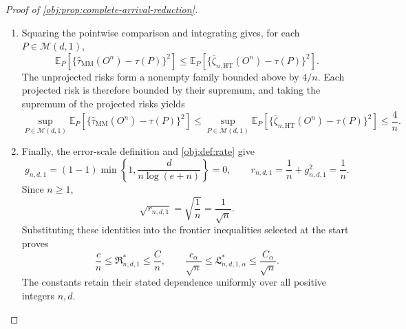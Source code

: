 \documentclass[11pt]{article}
\begin{document}
\begin{proof}[Proof of \cref{obj:prop:complete-arrival-reduction}]
\begin{enumerate}
\item Squaring the pointwise comparison and integrating gives, for each \(P\in\mathcal M(d,1)\),
\[
\mathbb E_P\!\left[
\{\widehat\tau_{\mathrm{MM}}(O^n)-\tau(P)\}^{2}
\right]
\le
\mathbb E_P\!\left[
\{\overline\zeta_{n,\mathrm{HT}}(O^n)-\tau(P)\}^{2}
\right].
\]
The unprojected risks form a nonempty family bounded above by \(4/n\). Each projected risk is therefore bounded by their supremum, and taking the supremum of the projected risks yields
\[
\sup_{P\in\mathcal M(d,1)}
\mathbb E_P\!\left[
\{\widehat\tau_{\mathrm{MM}}(O^n)-\tau(P)\}^{2}
\right]
\le
\sup_{P\in\mathcal M(d,1)}
\mathbb E_P\!\left[
\{\overline\zeta_{n,\mathrm{HT}}(O^n)-\tau(P)\}^{2}
\right]
\le\frac4n.
\]

\item Finally, the error-scale definition and \cref{obj:def:rate} give
\[
g_{n,d,1}
=(1-1)\min\left\{1,\frac{d}{n\log(e+n)}\right\}=0,
\qquad
r_{n,d,1}=\frac1n+g_{n,d,1}^{2}=\frac1n.
\]
Since \(n\ge1\),
\[
\sqrt{r_{n,d,1}}
=\sqrt{\frac1n}
=\frac1{\sqrt n}.
\]
Substituting these identities into the frontier inequalities selected at the start proves
\[
\frac cn\le\mathfrak R^*_{n,d,1}\le\frac Cn,
\qquad
\frac{c_\alpha}{\sqrt n}
\le\mathfrak L^*_{n,d,1,\alpha}
\le\frac{C_\alpha}{\sqrt n}.
\]
The constants retain their stated dependence uniformly over all positive integers \(n,d\).
\end{enumerate}
\end{proof}
\end{document}
